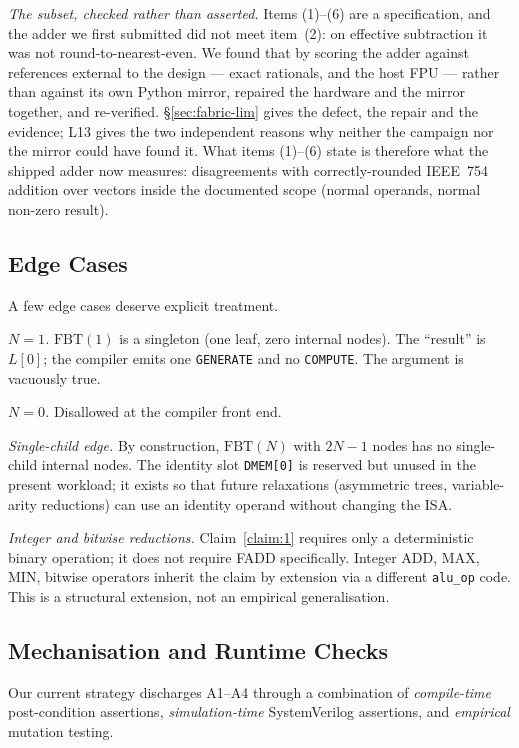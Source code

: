 \documentclass[journal,10pt]{IEEEtran}
\theoremstyle{plain}
\theoremstyle{definition}
\theoremstyle{remark}
\newcommand{\FBT}{\ensuremath{\mathrm{FBT}}}
\newcommand{\sv}[1]{\texttt{#1}}
\begin{document}
\emph{The subset, checked rather than asserted.} Items (1)--(6) are a
specification, and the adder we first submitted did not meet item~(2): on
effective subtraction it was not round-to-nearest-even. We found that by
scoring the adder against references external to the design --- exact
rationals, and the host FPU --- rather than against its own Python mirror,
repaired the hardware and the mirror together, and re-verified.
\S\ref{sec:fabric-lim} gives the defect, the repair and the evidence; L13
gives the two independent reasons why neither the campaign nor the mirror
could have found it. What items (1)--(6) state is therefore what the shipped
adder now measures: \FpSweepErrors{} disagreements with correctly-rounded
IEEE~754 addition over \FpSweepVectors{} vectors inside the documented scope
(normal operands, normal non-zero result).

\subsection{Edge Cases}\label{sec:abi-edge}

A few edge cases deserve explicit treatment.

\emph{$N = 1$.} $\FBT(1)$ is a singleton (one leaf, zero internal nodes).
The ``result'' is $L[0]$; the compiler emits one \texttt{GENERATE} and no
\texttt{COMPUTE}. The argument is vacuously true.

\emph{$N = 0$.} Disallowed at the compiler front end.

\emph{Single-child edge.} By construction, $\FBT(N)$ with $2N-1$ nodes
has no single-child internal nodes. The identity slot \texttt{DMEM[0]}
is reserved but unused in the present workload; it exists so that
future relaxations (asymmetric trees, variable-arity reductions) can
use an identity operand without changing the ISA.

\emph{Integer and bitwise reductions.} Claim~\ref{claim:1} requires only
a deterministic binary operation; it does not require FADD specifically.
Integer ADD, MAX, MIN, bitwise operators inherit the claim by extension
via a different \sv{alu\_op} code. This is a structural extension, not an
empirical generalisation.

\subsection{Mechanisation and Runtime Checks}\label{sec:mechanization}

Our current strategy discharges A1--A4 through a combination of
\emph{compile-time} post-condition assertions, \emph{simulation-time}
SystemVerilog assertions, and \emph{empirical} mutation testing.
\end{document}
